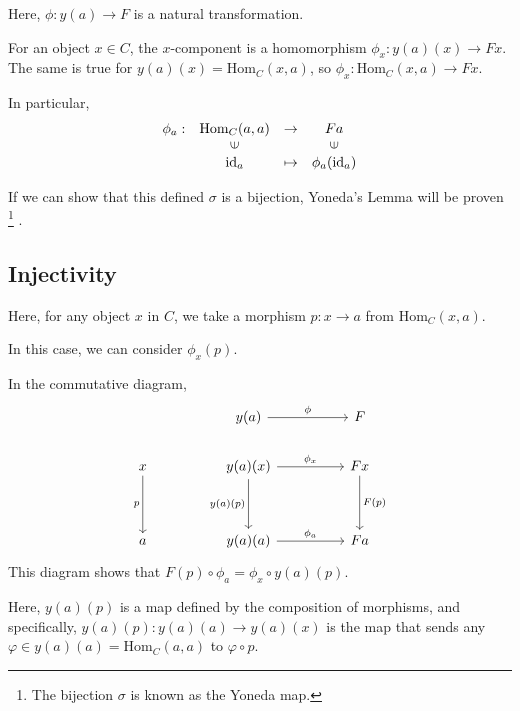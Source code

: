 \documentclass[uplatex,a4j,12pt,dvipdfmx]{jsarticle}
\begin{document}
Here, $\phi: y(a) \to F$ is a natural transformation.

For an object $x \in C$, the $x$-component is a homomorphism $\phi_{x} : y(a)(x) \to Fx$.
The same is true for $y(a)(x)=\text{Hom}_{C}(x,a)$, so $\phi_{x} : \text{Hom}_{C}(x,a) \to Fx$.

In particular,
\[
	\begin{array}{cccc}
		\phi_{a} : & \text{Hom}_{C}(a,a)     & \to     & Fa                      \\
		           & \rotatebox{90}{${\in}$} &         & \rotatebox{90}{${\in}$} \\
		           & \text{id}_{a}           & \mapsto & \phi_{a}(\text{id}_{a})
	\end{array}
\]

If we can show that this defined $\sigma$ is a bijection, Yoneda's Lemma will be proven
\footnote{
    The bijection $\sigma$ is known as the Yoneda map.
}
.

\subsection{Injectivity}

Here, for any object $x$ in $C$, we take a morphism $p: x \to a$ from $\text{Hom}_{C}(x,a)$.

In this case, we can consider $\phi_{x}(p)$.

In the commutative diagram,
\[
	\begin{tikzcd}
		&  & y(a) \arrow[rr, "\phi"]              &  & F                  \\
		x \arrow[dd, "p"'] &  & y(a)(x) \arrow[dd, "y(a)(p)"'] \arrow[rr, "\phi_{x}"] &  & Fx \arrow[dd, "F(p)"] \\
		&  &                                  &  &                    \\
		a                  &  & y(a)(a) \arrow[rr, "\phi_{a}"]     &  & Fa
	\end{tikzcd}
\]
This diagram shows that $F(p) \circ \phi_{a} = \phi_{x} \circ y(a)(p)$.

Here, $y(a)(p)$ is a map defined by the composition of morphisms, and specifically,
$y(a)(p): y(a)(a) \to y(a)(x)$ is the map that sends any $\varphi \in y(a)(a) = \text{Hom}_{C}(a,a)$ to $\varphi \circ p$.
\end{document}
